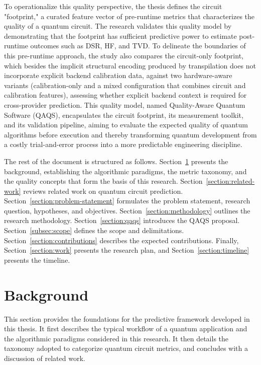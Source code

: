 \documentclass{article}
\begin{document}
To operationalize this quality perspective, the thesis defines the circuit "footprint," a curated feature vector of pre-runtime metrics that characterizes the quality of a quantum circuit. The research validates this quality model by demonstrating that the footprint has sufficient predictive power to estimate post-runtime outcomes such as DSR, HF, and TVD. To delineate the boundaries of this pre-runtime approach, the study also compares the circuit-only footprint, which besides the implicit structural encoding produced by transpilation does not incorporate explicit backend calibration data, against two hardware-aware variants (calibration-only and a mixed configuration that combines circuit and calibration features), assessing whether explicit backend context is required for cross-provider prediction. This quality model, named Quality-Aware Quantum Software (QAQS), encapsulates the circuit footprint, its measurement toolkit, and its validation pipeline, aiming to evaluate the expected quality of quantum algorithms before execution and thereby transforming quantum development from a costly trial-and-error process into a more predictable engineering discipline.

The rest of the document is structured as follows. Section~\ref{section:background} presents the background, establishing the algorithmic paradigms, the metric taxonomy, and the quality concepts that form the basis of this research. Section~\ref{section:related-work} reviews related work on quantum circuit prediction. Section~\ref{section:problem-statement} formulates the problem statement, research question, hypotheses, and objectives. Section~\ref{section:methodology} outlines the research methodology. Section~\ref{section:qaqs} introduces the QAQS proposal. Section~\ref{subsec:scope} defines the scope and delimitations. Section~\ref{section:contributions} describes the expected contributions. Finally, Section~\ref{section:work} presents the research plan, and Section~\ref{section:timeline} presents the timeline.

\section{Background}
\label{section:background}


This section provides the foundations for the predictive framework developed in this thesis. It first describes the typical workflow of a quantum application and the algorithmic paradigms considered in this research. It then details the taxonomy adopted to categorize quantum circuit metrics, and concludes with a discussion of related work.
\end{document}
